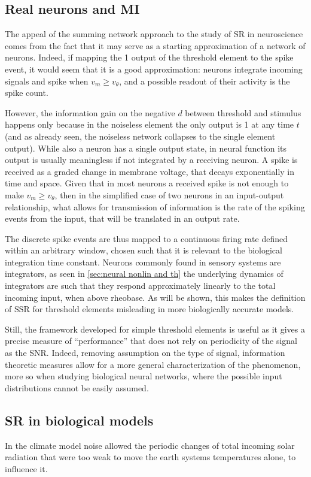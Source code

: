 \subsection{Real neurons and MI}
The appeal of the summing network approach to the study of SR in neuroscience comes from the fact that it may serve as a starting approximation of a network of neurons. 
Indeed, if mapping the 1 output of the threshold element to the spike event, it would seem that it is a good approximation: neurons integrate incoming signals and spike when $v_m\geq v_{\theta}$, and a possible readout of their activity is the spike count.

However, the information gain on the negative $d$ between threshold and stimulus happens only because in the noiseless element the only output is 1 at any time $t$ (and as already seen, the noiseless network collapses to the single element output). 
While also a neuron has a single output state, in neural function its output is usually meaningless if not integrated by a receiving neuron. 
A spike is received as a graded change in membrane voltage, that decays exponentially in time and space. 
Given that in most neurons a received spike is not enough to make $v_m\geq v_{\theta}$, then in the simplified case of two neurons in an input-output relationship, what allows for transmission of information is the rate of the spiking events from the input, that will be translated in an output rate. 

The discrete spike events are thus mapped to a continuous firing rate defined within an arbitrary window, chosen such that it is relevant to the biological integration time constant. 
Neurons commonly found in sensory systems are integrators, as seen in \ref{sec:neural nonlin and th} the underlying dynamics of integrators are such that they respond approximately linearly to the total incoming input, when above rheobase. 
As will be shown, this makes the definition of SSR for threshold elements misleading in more biologically accurate models. 

Still, the framework developed for simple threshold elements is useful as it gives a precise measure of \enquote{performance} that does not rely on periodicity of the signal as the SNR. 
Indeed, removing assumption on the type of signal, information theoretic measures allow for a more general characterization of the phenomenon, more so when studying biological neural networks, where the possible input distributions cannot be easily assumed.

\subsection{SR in biological models}
In the climate model noise allowed the periodic changes of total incoming solar radiation that were too weak to move the earth systems temperatures alone, to influence it. 

